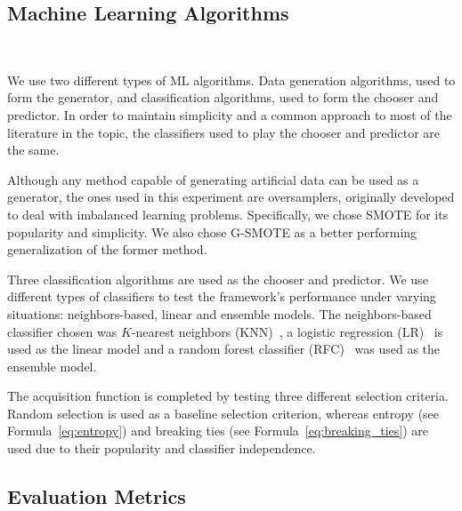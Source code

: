 \documentclass[parskip=full]{scrartcl}
\begin{document}

\subsection{Machine Learning Algorithms}~\label{sec:machine_learning_algorithms}

We use two different types of ML algorithms. Data generation algorithms, used
to form the generator, and classification algorithms, used to form the chooser
and predictor. In order to maintain simplicity and a common approach to most of
the literature in the topic, the classifiers used to play the chooser and
predictor are the same.

Although any method capable of generating artificial data can be used as a
generator, the ones used in this experiment are oversamplers, originally
developed to deal with imbalanced learning problems. Specifically, we chose
SMOTE for its popularity and simplicity. We also chose G-SMOTE as a better
performing generalization of the former method.

Three classification algorithms are used as the chooser and predictor. We use
different types of classifiers to test the framework's performance under
varying situations: neighbors-based, linear and ensemble models. The
neighbors-based classifier chosen was $K$-nearest neighbors
(KNN)~\cite{Cover1967}, a logistic regression (LR)~\cite{Nelder1972} is used as
the linear model and a random forest classifier (RFC)~\cite{Ho1995} was used as
the ensemble model.

The acquisition function is completed by testing three different selection
criteria. Random selection is used as a baseline selection criterion, whereas
entropy (see Formula~\ref{eq:entropy}) and breaking ties (see
Formula~\ref{eq:breaking_ties}) are used due to their popularity and classifier
independence. 

\subsection{Evaluation Metrics}~\label{sec:evaluation_metrics}
\end{document}
